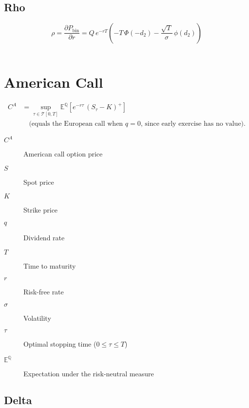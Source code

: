 \documentclass[12pt,a4paper]{article}
\begin{document}
\[
  \begin{aligned}
  \end{aligned}
\]

\subsection{Rho}
\[
  \boxed{\rho = \frac{\partial P_{\mathrm{bin}}}{\partial r}
  = Q\, e^{-rT}\!\left(
    -T\,\Phi(-d_2)
    - \frac{\sqrt{T}}{\sigma}\,\phi(d_2)
  \right)}
\]

\[
  \begin{aligned}
  \end{aligned}
\]

\newpage

\section{American Call}

\[
  \begin{aligned}
    C^{A} & = \sup_{\tau \in \mathcal{T}[0,T]} \mathbb{E}^{\mathbb{Q}}\!\left[ e^{-r \tau}\,(S_{\tau}-K)^{+} \right] \\[4pt]
          & \quad \text{(equals the European call when $q=0$, since early exercise has no value).}
  \end{aligned}
\]

\begin{description}
  \item[$C^{A}$] American call option price
  \item[$S$] Spot price
  \item[$K$] Strike price
  \item[$q$] Dividend rate
  \item[$T$] Time to maturity
  \item[$r$] Risk-free rate
  \item[$\sigma$] Volatility
  \item[$\tau$] Optimal stopping time (\( 0 \le \tau \le T \))
  \item[$\mathbb{E}^{\mathbb{Q}}$] Expectation under the risk-neutral measure
\end{description}

\subsection{Delta}
\[
  \begin{aligned}
  \end{aligned}
\]
\end{document}
